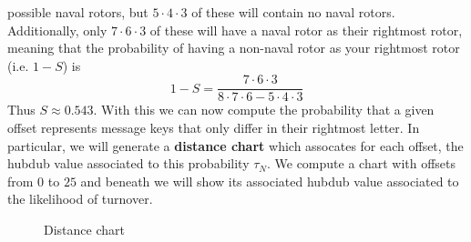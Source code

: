 possible naval rotors, but $5\cdot4\cdot3$ of these will contain no
naval rotors. Additionally, only $7\cdot6\cdot3$ of these will have
a naval rotor as their rightmost rotor, meaning that the
probability of having a non-naval rotor as your rightmost rotor (i.e. $1-S$) is
\[
	1-S = \frac{7\cdot6\cdot3}{8\cdot7\cdot6 - 5\cdot4\cdot3}
\]
Thus $S\approx0.543$. With this we can now compute the probability
that a given offset represents message keys that only differ in
their rightmost letter. In particular, we will generate a
	{\bf{distance chart}} which assocates for each offset, the hubdub
value associated to this probability $\tau_N$. We compute a chart
with offsets from $0$ to $25$ and beneath we will show its
associated hubdub value associated to the likelihood of turnover.
\begin{figure}[H]
	\begin{center}
	\end{center}
	\caption{Distance chart}
	\label{fig:distance_chart}
\end{figure}
